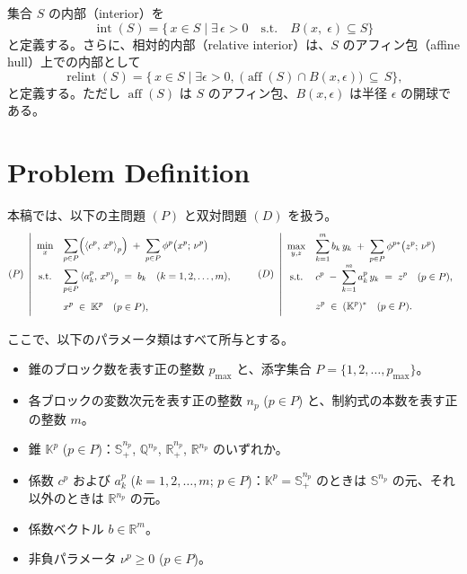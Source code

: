 \documentclass{jsarticle}
\newcommand{\inprod}[2]{\left\langle #1, \, #2 \right\rangle}
\begin{document}
集合 $S$ の内部（interior）を 
\[
  \operatorname{int}(S) 
  = \{\, x \in S \mid \exists\, \epsilon > 0 \quad \text{s.t.} \quad B(x,\; \epsilon) \subseteq S \}
\]
と定義する。さらに、相対的内部（relative interior）は、$S$ のアフィン包（affine hull）上での内部として  
\[
\operatorname{relint}(S)
=\{\,
x \in S 
\mid \exists \epsilon>0,\; \bigl(\operatorname{aff}(S)\cap B(x,\epsilon)\bigr)\,\subseteq\,S
\},
\]
と定義する。ただし $\operatorname{aff}(S)$ は $S$ のアフィン包、$B(x,\epsilon)$ は半径 $\epsilon$ の開球である。




\section{Problem Definition}

本稿では、以下の主問題 $(P)$ と双対問題 $(D)$ を扱う。
\begin{equation*}
    \everymath{\displaystyle}
    \renewcommand{\arraystretch}{2.0}
    (P)~
    \left|
    \begin{array}{cl}
         \min_{x} & \displaystyle 
             \sum_{p \in P} \Bigl(\inprod{c^p}{x^p}_p\Bigr) 
             \;+\;\sum_{p \in P} \phi^p\bigl(x^p;\,\nu^p\bigr) \\[3pt]
         \text{s.t.} 
         & \displaystyle 
             \sum_{p \in P} \inprod{a^p_{k}}{x^p}_p 
             \;=\; b_k \quad (k= 1,2,\ldots,m), \\[3pt]
         & x^p \;\in\; \mathbb{K}^p \quad (p\in P),
    \end{array}
    \right.
    \qquad
    (D)~
    \left|
    \begin{array}{cl}
         \max_{y,z} & \displaystyle 
            \sum_{k=1}^m b_k\, y_k 
            \;+\;\sum_{p \in P} \phi^{p*}\bigl(z^p;\,\nu^p\bigr) \\[3pt]
         \text{s.t.} 
         & \displaystyle 
            c^p \;-\; \sum_{k=1}^m a^p_k\,y_k \;=\; z^p \quad (p\in P), \\[3pt]
         & z^p \;\in\; (\mathbb{K}^p)^* \quad (p\in P).
    \end{array}
    \right.
\end{equation*}

ここで、以下のパラメータ類はすべて所与とする。
\begin{itemize}
    \item 錐のブロック数を表す正の整数 $p_{\max}$ と、添字集合 $P = \{1,2,\ldots,p_{\max}\}$。
    \item 各ブロックの変数次元を表す正の整数 $n_p$ ($p \in P$) と、制約式の本数を表す正の整数 $m$。
    \item 錐 $\mathbb{K}^p$ ($p \in P$)：$\mathbb{S}^{n_p}_+$, $\mathbb{Q}^{n_p}$, $\mathbb{R}^{n_p}_+$, $\mathbb{R}^{n_p}$ のいずれか。
    \item 係数 $c^p$ および $a^p_k$ ($k=1,2,\ldots,m;\, p\in P$)：$\mathbb{K}^p=\mathbb{S}^{n_p}_+$ のときは $\mathbb{S}^{n_p}$ の元、それ以外のときは $\mathbb{R}^{n_p}$ の元。
    \item 係数ベクトル $b \in \mathbb{R}^m$。
    \item 非負パラメータ $\nu^p \ge 0$ ($p\in P$)。
\end{itemize}
\end{document}
